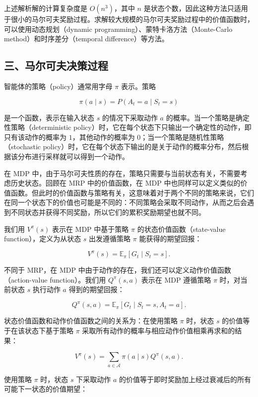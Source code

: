 上述解析解的计算复杂度是 \(O(n^{3})\)，其中 \(n\) 是状态个数，因此这种方法只适用于很小的马尔可夫奖励过程。求解较大规模的马尔可夫奖励过程中的价值函数时，可以使用动态规划（dynamic programming）、蒙特卡洛方法（Monte-Carlo method）和时序差分（temporal difference）等方法。

\hypertarget{ux4e09ux9a6cux5c14ux53efux592bux51b3ux7b56ux8fc7ux7a0b}{%
\subsection{三、马尔可夫决策过程}\label{ux4e09ux9a6cux5c14ux53efux592bux51b3ux7b56ux8fc7ux7a0b}}

智能体的策略（policy）通常用字母 \(\pi\) 表示。策略

\[
\pi(a\mid s)=P(A_t=a\mid S_t=s)
\]

是一个函数，表示在输入状态 \(s\) 的情况下采取动作 \(a\) 的概率。当一个策略是确定性策略（deterministic policy）时，它在每个状态下只输出一个确定性的动作，即只有该动作的概率为 \(1\)，其他动作的概率为 \(0\)；当一个策略是随机性策略（stochastic policy）时，它在每个状态下输出的是关于动作的概率分布，然后根据该分布进行采样就可以得到一个动作。

在 MDP 中，由于马尔可夫性质的存在，策略只需要与当前状态有关，不需要考虑历史状态。回顾在 MRP 中的价值函数，在 MDP 中也同样可以定义类似的价值函数。但此时的价值函数与策略有关，这意味着对于两个不同的策略来说，它们在同一个状态下的价值也可能是不同的：不同策略会采取不同动作，从而之后会遇到不同状态并获得不同奖励，所以它们的累积奖励期望也就不同。

我们用 \(V^{\pi}(s)\) 表示在 MDP 中基于策略 \(\pi\) 的状态价值函数（state-value function），定义为从状态 \(s\) 出发遵循策略 \(\pi\) 能获得的期望回报：

\[
V^{\pi}(s)=\mathbb{E}_{\pi}[G_t\mid S_t=s].
\]

不同于 MRP，在 MDP 中由于动作的存在，我们还可以定义动作价值函数（action-value function）。我们用 \(Q^{\pi}(s,a)\) 表示在 MDP 遵循策略 \(\pi\) 时，对当前状态 \(s\) 执行动作 \(a\) 得到的期望回报：

\[
Q^{\pi}(s,a)=\mathbb{E}_{\pi}[G_t\mid S_t=s,A_t=a].
\]

状态价值函数和动作价值函数之间的关系为：在使用策略 \(\pi\) 时，状态 \(s\) 的价值等于在该状态下基于策略 \(\pi\) 采取所有动作的概率与相应动作价值相乘再求和的结果：

\[
V^{\pi}(s)=\sum_{a\in\mathcal{A}}\pi(a\mid s)Q^{\pi}(s,a).
\]

使用策略 \(\pi\) 时，状态 \(s\) 下采取动作 \(a\) 的价值等于即时奖励加上经过衰减后的所有可能下一状态的价值期望：

